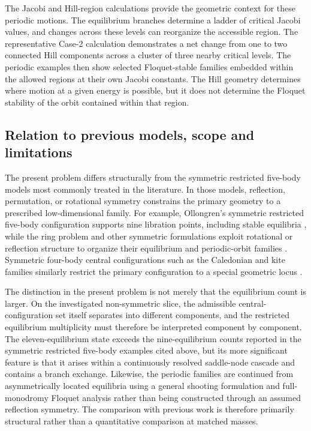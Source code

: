 The Jacobi and Hill-region calculations provide the geometric context for
these periodic motions. The equilibrium branches determine a ladder of
critical Jacobi values, and changes across these levels can reorganize the
accessible region. The representative Case-2 calculation demonstrates a
net change from one to two connected Hill components across a cluster of
three nearby critical levels. The periodic examples then show selected
Floquet-stable families embedded within the allowed regions at their own
Jacobi constants. The Hill geometry determines where motion at a given
energy is possible, but it does not determine the Floquet stability of the
orbit contained within that region.


\subsection{Relation to previous models, scope and limitations}
\label{subsec:discussion_scope}

The present problem differs structurally from the symmetric restricted
five-body models most commonly treated in the literature. In those models,
reflection, permutation, or rotational symmetry constrains the primary
geometry to a prescribed low-dimensional family. For example, Ollongren's
symmetric restricted five-body configuration supports nine libration
points, including stable equilibria \cite{ollongren1988}, while the ring
problem and other symmetric formulations exploit rotational or reflection
structure to organize their equilibrium and periodic-orbit families
\cite{kalvouridis1999,zotospapadakis2019,zotossuraj2018}. Symmetric
four-body central configurations such as the Caledonian and kite families
similarly restrict the primary configuration to a special geometric locus
\cite{stevesroy1998,benhammouda2020}.

The distinction in the present problem is not merely that the equilibrium
count is larger. On the investigated non-symmetric slice, the admissible
central-configuration set itself separates into different components, and
the restricted equilibrium multiplicity must therefore be interpreted
component by component. The eleven-equilibrium state exceeds the
nine-equilibrium counts reported in the symmetric restricted five-body
examples cited above, but its more significant feature is that it arises
within a continuously resolved saddle-node cascade and contains a branch
exchange. Likewise, the periodic families are continued from
asymmetrically located equilibria using a general shooting formulation and
full-monodromy Floquet analysis rather than being constructed through an
assumed reflection symmetry. The comparison with previous work is therefore
primarily structural rather than a quantitative comparison at matched
masses.

